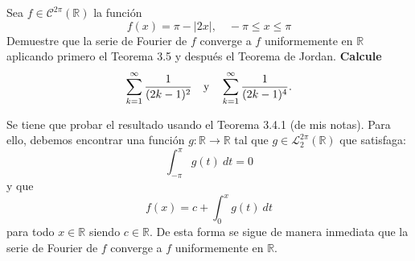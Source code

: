 \documentclass[12pt]{report}
\theoremstyle{largebreak}
\renewcommand{\leq}{\ensuremath{\leqslant}}
\newcommand\abs[1]{\ensuremath{\left|#1\right|}}
\newcommand\cf[3]{\ensuremath{#1:#2\rightarrow#3}}
\begin{document}
    \begin{excer}
        Sea $f\in\mathcal{C}^{2\pi}(\mathbb{R})$ la función
        \begin{equation*}
            f(x)=\pi-\abs{2x},\quad-\pi\leq x\leq\pi
        \end{equation*}
        Demuestre que la serie de Fourier de $f$ converge a $f$ uniformemente en $\mathbb{R}$ aplicando primero el Teorema 3.5 y después el Teorema de Jordan. \textbf{Calcule}
        \begin{equation*}
            \sum_{ k=1}^\infty\frac{1}{(2k-1)^2}\quad\textup{y}\quad\sum_{ k=1}^\infty\frac{1}{(2k-1)^4}.
        \end{equation*}
    \end{excer}

    \begin{sol}
        Se tiene que probar el resultado usando el Teorema 3.4.1 (de mis notas). Para ello, debemos encontrar una función $\cf{g}{\mathbb{R}}{\mathbb{R}}$ tal que $g\in\mathcal{L}_2^{2\pi}(\mathbb{R})$ que satisfaga:
        \begin{equation*}
            \int_{-\pi}^{\pi}g(t)\:dt=0
        \end{equation*}
        y que
        \begin{equation*}
            f(x)=c+\int_{0}^{x}g(t)\:dt
        \end{equation*}
        para todo $x\in\mathbb{R}$ siendo $c\in\mathbb{R}$. De esta forma se sigue de manera inmediata que la serie de Fourier de $f$ converge a $f$ uniformemente en $\mathbb{R}$.


\end{sol}
\end{document}
